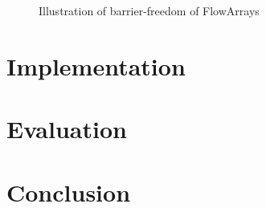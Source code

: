\documentclass[runningheads,a4paper,fleqn]{llncs}
\begin{document}
\begin{figure}
  \caption{Illustration of barrier-freedom of FlowArrays}
  \label{fig:barrier-free}
\end{figure}

\section{Implementation}
\label{sec:implementation}

\section{Evaluation}
\label{sec:evaluation}

\section{Conclusion}



\end{document}

